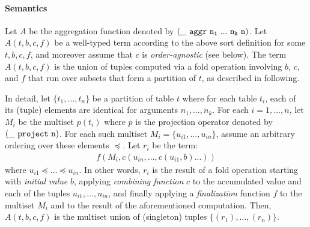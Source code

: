\documentclass[english,a4paper,10pt]{article}
\begin{document}
\paragraph{Semantics}
Let $A$ be the aggregation function
denoted by $
{\tt (\_\ aggr\ n_1\ ...\ n_k\ n)}$.
Let $A( t, b, c, f)$ be a well-typed term
according to the above sort definition for some $t, b, c, f$,
and moreover assume that $c$ is \emph{order-agnostic} (see below).
The term $A( t, b, c, f)$ is
the union of tuples computed via a fold operation involving $b$, $c$, and $f$
that run over subsets that form a partition of $t$, as described in following.

In detail,
let $\{ t_1, \ldots, t_n \}$ be a partition of table $t$
where for each table $t_i$, each of its (tuple) elements
are identical for arguments $n_1, \ldots, n_k$.
For each $i = 1, \ldots, n$,
let $M_i$ be the multiset $p(t_i)$
where $p$ is the projection operator denoted by ${\tt (\_\ project\ n)}$.
For each such multiset $M_i = \{ u_{i1}, \ldots, u_{in} \}$,
assume an arbitrary ordering over these elements $\preceq$.
Let $r_i$ be the term:
\begin{align*}
f( M_i, c( u_{in}, \ldots, c( u_{i1}, b ) \ldots ) )
\end{align*}
where $u_{i1} \preceq \ldots \preceq u_{in}$.
In other words,
$r_i$ is the result of a fold operation
starting with \emph{initial value} $b$,
applying \emph{combining function} $c$ to
the accumulated value and each of the tuples $u_{i1}, \ldots, u_{in}$,
and finally applying a \emph{finalization} function $f$
to the multiset $M_i$ and to the result of the aforementioned computation.
Then,
$A( t, b, c, f)$ is
the multiset union of (singleton) tuples $\{ (r_1), \ldots, (r_n) \}$.
\end{document}
